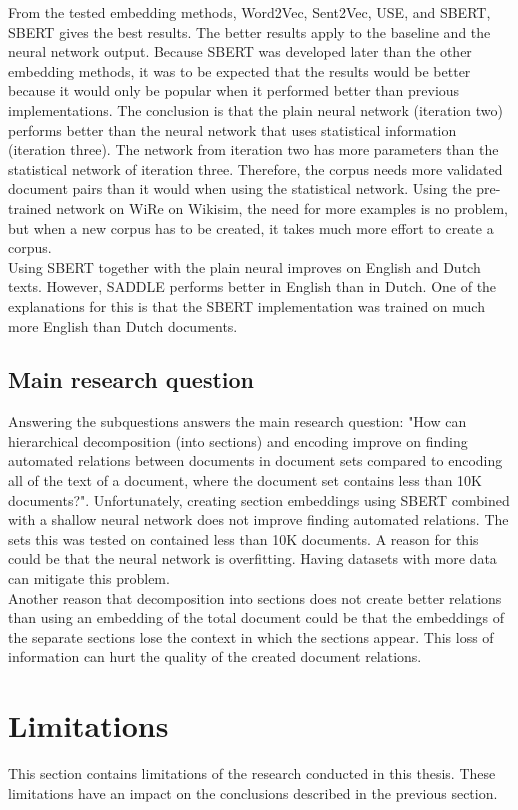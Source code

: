 From the tested embedding methods, Word2Vec, Sent2Vec, USE, and SBERT, SBERT gives the best results. The better results apply to the baseline and the neural network output. Because SBERT was developed later than the other embedding methods, it was to be expected that the results would be better because it would only be popular when it performed better than previous implementations. The conclusion is that the plain neural network  (iteration two) performs better than the neural network that uses statistical information (iteration three). The network from iteration two has more parameters than the statistical network of iteration three. Therefore, the corpus needs more validated document pairs than it would when using the statistical network. Using the pre-trained network on WiRe on Wikisim, the need for more examples is no problem, but when a new corpus has to be created, it takes much more effort to create a corpus.\\
Using SBERT together with the plain neural improves on English and Dutch texts. However, SADDLE performs better in English than in Dutch. One of the explanations for this is that the SBERT implementation was trained on much more English than Dutch documents.\\

\subsection{Main research question}

Answering the subquestions answers the main research question: "How can hierarchical decomposition (into sections) and encoding improve on finding automated relations between documents in document sets compared to encoding all of the text of a document, where the document set contains less than 10K documents?". Unfortunately, creating section embeddings using SBERT combined with a shallow neural network does not improve finding automated relations. The sets this was tested on contained less than 10K documents. A reason for this could be that the neural network is overfitting. Having datasets with more data can mitigate this problem.\\

Another reason that decomposition into sections does not create better relations than using an embedding of the total document could be that the embeddings of the separate sections lose the context in which the sections appear. This loss of information can hurt the quality of the created document relations. 
\section{Limitations}
This section contains limitations of the research conducted in this thesis. These limitations have an impact on the conclusions described in the previous section.\\

